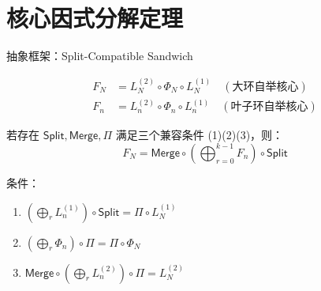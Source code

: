 \documentclass[aspectratio=169, 10pt, xcolor=svgnames, table, UTF8]{ctexbeamer}
\newcommand{\splitop}{\mathsf{Split}}
\newcommand{\mergeop}{\mathsf{Merge}}
\begin{document}
\section{核心因式分解定理}

\begin{frame}{抽象框架：Split-Compatible Sandwich}
  \begin{definition}[Sandwich 结构]
    \begin{align*}
      F_N &= L_N^{(2)} \circ \Phi_N \circ L_N^{(1)} \quad (\text{大环自举核心})\\
      F_n &= L_n^{(2)} \circ \Phi_n \circ L_n^{(1)} \quad (\text{叶子环自举核心})
    \end{align*}
  \end{definition}
  
  \pause
  
  \begin{theorem}
    若存在 \(\splitop, \mergeop, \Pi\) 满足三个兼容条件 (1)(2)(3)，则：
    \[
    \boxed{F_N = \mergeop \circ \left(\bigoplus_{r=0}^{k-1} F_n\right) \circ \splitop}
    \]
  \end{theorem}
  
  条件：
  \begin{enumerate}
    \item[(1)] \((\bigoplus_r L_n^{(1)}) \circ \splitop = \Pi \circ L_N^{(1)}\)
    \item[(2)] \((\bigoplus_r \Phi_n) \circ \Pi = \Pi \circ \Phi_N\)
    \item[(3)] \(\mergeop \circ (\bigoplus_r L_n^{(2)}) \circ \Pi = L_N^{(2)}\)
  \end{enumerate}
\end{frame}
\end{document}
